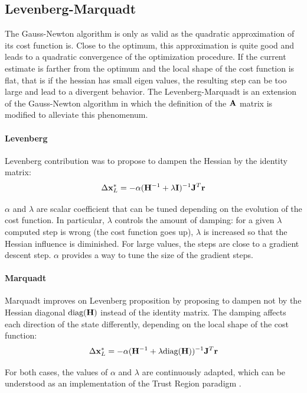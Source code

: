 \subsection{Levenberg-Marquadt}
The Gauss-Newton algorithm is only as valid as the quadratic approximation of its cost function is. Close to the optimum, this approximation
is quite good and leads to a quadratic convergence of the optimization procedure. If the current estimate is farther from the optimum and the
local shape of the cost function is flat, that is if the hessian has small eigen values, the resulting step can be too large and lead to a 
divergent behavior. The Levenberg-Marquadt is an extension of the Gauss-Newton algorithm in which the definition of the ${\bf A}$ matrix is modified
to alleviate this phenomenum.

\paragraph{Levenberg}
Levenberg \cite{levenberg1944method} contribution was to propose to dampen the Hessian by the identity matrix:
%
\begin{equation}
    \Delta {\bf x}_{L}^* = - \alpha ({\bf H}^{-1} + \lambda {\bf I})^{-1} {\bf J}^T {\bf r}
\end{equation}
%

$\alpha$ and $\lambda$ are scalar coefficient that can be tuned depending on the evolution of the cost function. 
In particular, $\lambda$ controls the amount of damping: for a given $\lambda$ computed step is wrong (the cost function goes up),
$\lambda$ is increased so that the Hessian influence is diminished. For large values, the steps are close to a gradient descent step.
$\alpha$ provides a way to tune the size of the gradient steps.

\paragraph{Marquadt}
Marquadt \cite{marquardt1963algorithm} improves on Levenberg proposition by proposing to dampen not by the Hessian diagonal $\text{diag}({\bf H})$
instead of the identity matrix. The damping affects each direction of the state differently, depending on the local shape of the cost function:
%
\begin{equation}
    \Delta {\bf x}_{L}^* = - \alpha ({\bf H}^{-1} + \lambda \text{diag}({\bf H}))^{-1} {\bf J}^T {\bf r}
\end{equation}
%

For both cases, the values of $\alpha$ and $\lambda$ are continuously adapted, which can be understood as an implementation of the 
Trust Region paradigm \cite{boyd2004convex}.


